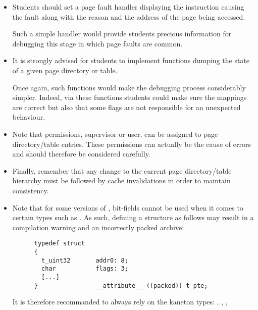 \begin{itemize}
  \item
    Students should set a page fault handler displaying the instruction causing
    the fault along with the reason and the address of the page being accessed.

    \-

    Such a simple handler would provide students precious information for
    debugging this stage in which page faults are common.
  \item
    It is strongly advised for students to implement functions dumping the
    state of a given page directory or table.

    \-

    Once again, such functions would make the debugging process considerably
    simpler. Indeed, via these functions students could make sure the mappings
    are correct but also that some flags are not responsible for an
    unexpected behaviour.
  \item
    Note that permissions, supervisor or user, can be assigned to page
    directory/table entries. These permissions can actually be the cause
    of errors and should therefore be considered carefully.
  \item
    Finally, remember that any change to the current page directory/table
    hierarchy must be followed by cache invalidations in order to maintain
    consistency.
  \item
    Note that for some versions of , bit-fields cannot be used
    when it comes to certain types such as . As such, defining
    a structure as follows may result in a compilation warning and an
    incorrectly packed archive:

    \-

    \begin{verbatim}
      typedef struct
      {
        t_uint32       addr0: 8;
        char           flags: 3;
        [...]
      }                __attribute__ ((packed)) t_pte;
    \end{verbatim}

    \-

    It is therefore recommanded to always rely on the kaneton types:
    , , , 
    \etc{}
\end{itemize}

